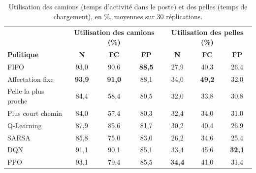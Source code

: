 \documentclass[11pt,a4paper]{article}
\newif\ifrevmarks
\newcommand{\revtag}[1]{\ifrevmarks\textsuperscript{\textcolor{red!70!black}{\scriptsize[#1]}}\fi}
\newcommand{\rev}[2]{\ifrevmarks{\color{revcolor}#2}\revtag{#1}\else#2\fi}
\begin{document}
\begin{table}[H]
\centering
\caption{\rev{M2, m18}{Utilisation des camions (temps d'activité dans le poste) et des pelles (temps de chargement), en \%, moyennes sur 30 réplications.}}
\label{tab:efficiency}
\footnotesize\setlength{\tabcolsep}{4pt}
\begin{tabular}{lccc|ccc}
\toprule
 & \multicolumn{3}{c|}{\textbf{Utilisation des camions (\%)}} & \multicolumn{3}{c}{\textbf{Utilisation des pelles (\%)}} \\
\textbf{Politique} & \textbf{N} & \textbf{FC} & \textbf{FP} & \textbf{N} & \textbf{FC} & \textbf{FP} \\
\midrule
FIFO                 & 93,0 & 90,6 & \textbf{88,5} & 27,9 & 40,3 & 26,4 \\
Affectation fixe     & \textbf{93,9} & \textbf{91,0} & 88,1 & 34,0 & \textbf{49,2} & 32,0 \\
Pelle la plus proche & 84,4 & 58,4 & 80,5 & 32,0 & 33,8 & 30,8 \\
Plus court chemin    & 84,0 & 57,4 & 80,3 & 32,4 & 34,0 & 31,0 \\
Q-Learning           & 87,9 & 85,6 & 81,7 & 30,2 & 40,4 & 26,9 \\
SARSA                & 85,8 & 75,0 & 83,0 & 26,2 & 34,6 & 25,4 \\
DQN                  & 91,1 & 90,1 & 85,1 & 33,4 & 45,6 & \textbf{32,1} \\
PPO                  & 93,1 & 79,4 & 85,5 & \textbf{34,4} & 41,0 & 31,4 \\
\bottomrule
\end{tabular}
\end{table}
\end{document}
